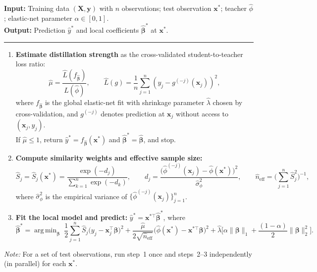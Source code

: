 \documentclass[12pt]{article}
\DeclareMathOperator*{\argmin}{arg\,min}
\theoremstyle{definition}
\begin{document}
\begin{algorithm}[H]
  \caption{Local distillation for regularized linear models}
  \textbf{Input:} Training data $(\bm{X}, \bm{y})$ with $n$ observations; test observation $\bm{x}^*$; teacher $\hat\phi$; elastic-net parameter $\alpha \in [0,1]$.\\
  \textbf{Output:} Prediction $\hat{y}^*$ and local coefficients $\hat{\bm \beta}^*$ at $\bm{x}^*$.
  \hrule
  \begin{enumerate}
    \item \textbf{Estimate distillation strength} as the cross-validated student-to-teacher loss ratio:
    \begin{equation}
    \hat\mu = \frac{\hat{L}(f_{\hat{\bm\beta}})}{\hat{L}(\hat\phi)},
    \qquad
    \hat{L}(g) = \frac{1}{n}\sum_{j=1}^{n}\left(y_j - g^{(-j)}(\bm{x}_j)\right)^2,
    \label{eqn:muhat}
    \end{equation}
    where $f_{\hat{\bm\beta}}$ is the global elastic-net fit with shrinkage parameter $\hat\lambda$ chosen by cross-validation, and $g^{(-j)}$ denotes prediction at $\bm{x}_j$ without access to $(\bm{x}_j, y_j)$. \\
    If $\hat\mu \le 1$, return $\hat{y}^* = f_{\hat{\bm\beta}}(\bm{x}^*)$ and $\hat{\bm\beta}^* = \hat{\bm\beta}$, and stop.
    \item \textbf{Compute similarity weights and effective sample size:}
    \begin{equation}
      \hat{S}_j =\hat{S}_j(\bm{x}^*)= \frac{\exp(-d_j)}{\sum_{k=1}^n \exp(-d_k)},
      \qquad
      d_j = \frac{\bigl(\hat\phi^{(-j)}(\bm{x}_j) - \hat\phi(\bm{x}^*)\bigr)^2}{\hat\sigma^2_\phi},
      \qquad
      \hat n_{\text{eff}} = \biggl(\sum_{j=1}^n \hat{S}_j^2\biggr)^{-1},
      \label{eq:weights}
    \end{equation}
    where $\hat\sigma^2_\phi$ is the empirical variance of $\{\hat\phi^{(-j)}(\bm{x}_j)\}_{j=1}^n$.  
    \item \textbf{Fit the local model and predict:}
    $\hat{y}^* = \bm{x}^{*\top}\hat{\bm\beta}^*$, where
    \begin{equation}
      \hat{\bm\beta}^* = \argmin_{\bm\beta} \;
        \frac{1}{2}  \sum_{j=1}^{n} \hat{S}_j\bigl(y_j - \bm{x}_j^\top\bm\beta\bigr)^2
        + \frac{\hat\mu}{2 \sqrt{\hat n_{\text{eff}}}}
              \bigl(\hat\phi(\bm{x}^*) - \bm{x}^{*\top}\bm\beta\bigr)^2
        + \hat\lambda\bigl[\alpha\|\bm\beta\|_1 + \frac{(1-\alpha)}{2}\|\bm\beta\|_2^2\bigr].
        \label{eq:loss}
    \end{equation}
  \end{enumerate}
  \vspace{0.25em}
  {\footnotesize \textit{Note:} For a set of test observations, run step~1 once and steps~2--3 independently (in parallel) for each $\bm{x}^*$.}
  \label{alg:local_distill}
\end{algorithm}
\end{document}
